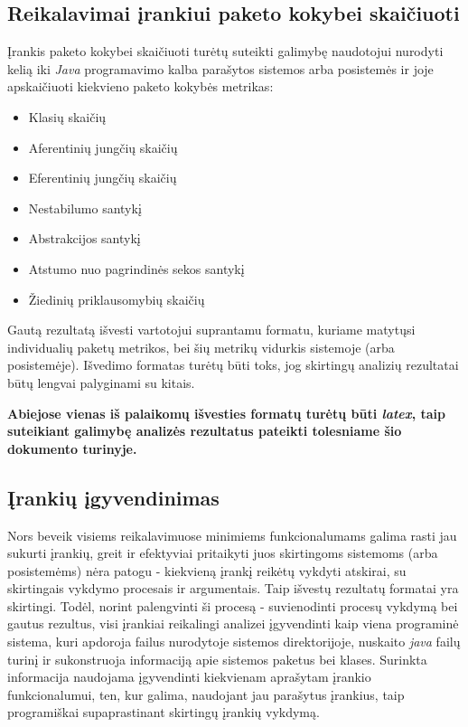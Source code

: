 \subsection{Reikalavimai įrankiui paketo kokybei skaičiuoti}
Įrankis paketo kokybei skaičiuoti turėtų suteikti galimybę naudotojui nurodyti kelią iki \textit{Java} programavimo kalba parašytos sistemos arba posistemės ir joje
apskaičiuoti kiekvieno paketo kokybės metrikas:
\begin{itemize}
    \item Klasių skaičių
    \item Aferentinių jungčių skaičių
    \item Eferentinių jungčių skaičių
    \item Nestabilumo santykį
    \item Abstrakcijos santykį
    \item Atstumo nuo pagrindinės sekos santykį
    \item Žiedinių priklausomybių skaičių
\end{itemize}
Gautą rezultatą išvesti vartotojui suprantamu formatu, kuriame matytųsi individualių paketų metrikos, bei šių metrikų vidurkis sistemoje (arba posistemėje).
Išvedimo formatas turėtų būti toks, jog skirtingų analizių rezultatai būtų lengvai palyginami su kitais.

\textbf{Abiejose vienas iš palaikomų išvesties formatų turėtų būti \textit{latex}, taip suteikiant galimybę analizės rezultatus pateikti tolesniame šio dokumento turinyje.}

\subsection{Įrankių įgyvendinimas}
Nors beveik visiems reikalavimuose minimiems funkcionalumams galima rasti jau sukurti įrankių, greit ir efektyviai pritaikyti juos skirtingoms sistemoms
(arba posistemėms) nėra patogu - kiekvieną įrankį reikėtų vykdyti atskirai, su skirtingais vykdymo procesais ir argumentais. Taip išvestų rezultatų formatai yra skirtingi.
Todėl, norint palengvinti ši procesą - suvienodinti procesų vykdymą bei gautus rezultus, visi įrankiai reikalingi analizei įgyvendinti kaip viena programinė sistema, kuri
apdoroja failus nurodytoje sistemos direktorijoje, nuskaito \textit{java} failų turinį ir sukonstruoja informaciją apie sistemos paketus bei klases.
Surinkta informacija naudojama įgyvendinti kiekvienam aprašytam įrankio funkcionalumui, ten, kur galima, naudojant jau parašytus įrankius, taip programiškai supaprastinant
skirtingų įrankių vykdymą.
